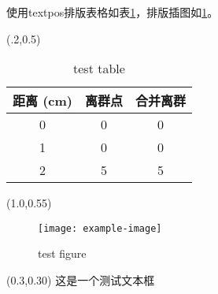 \documentclass{ctexart}
\begin{document}
\setlength{\TPHorizModule}{\textwidth}
\setlength{\TPVertModule}{\textwidth}
  
使用textpos排版表格如表\ref{tab:test}，排版插图如\ref{fig:test}。
  
\begin{textblock}{0.5}(.2,0.5) \vspace{0pt}
  \begin{table}
    \centering
    \caption{test table}\label{tab:test}
    \begin{tabular}{ccc}
      \hline            
      距离 (cm) & 离群点 & 合并离群 \\ \hline
      0 & 0 & 0 \\
      1 & 0 & 0 \\
      2 & 5 & 5 \\
      \hline
    \end{tabular}
  \end{table}
\end{textblock}
 
\begin{textblock}{0.4}(1.0,0.55)
  \begin{figure}
    \centering \texttt{[image: example-image]}
    \caption{test figure}\label{fig:test}
  \end{figure}
\end{textblock}

 \begin{textblock}{1.5}(0.3,0.30)
   这是一个测试文本框
 \end{textblock}
\end{document}
